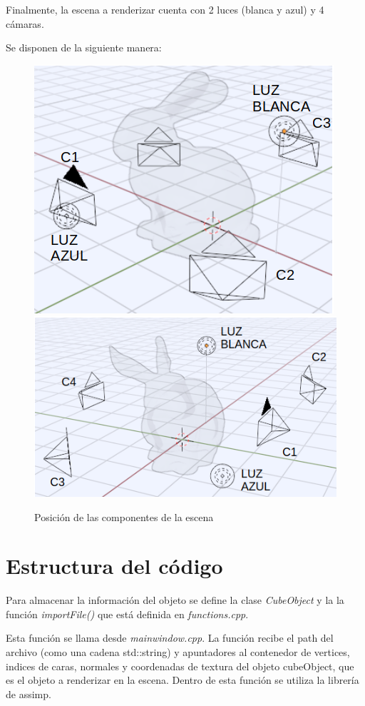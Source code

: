 \documentclass[12pt]{article}
\begin{document}
Finalmente, la escena a renderizar cuenta con 2 luces (blanca y azul) y 4 cámaras.

Se disponen de la siguiente manera: 


\begin{figure}[H]
\centering
\includegraphics[scale=0.5]{images/escena11.png}
\includegraphics[scale=0.5]{images/escena22.png}
\caption{Posición de las componentes de la escena}
\end{figure}



\section{Estructura del código}

Para almacenar la información del objeto se define la clase \textit{CubeObject} y la  la función \textit{importFile()} que está definida en \textit{functions.cpp}.

Esta función se llama desde \textit{mainwindow.cpp}. La función recibe el path del archivo (como una cadena std::string) y apuntadores al contenedor de vertices, indices de caras, normales y coordenadas de textura del objeto cubeObject, que es el objeto  a renderizar en la escena. Dentro de esta función se utiliza la librería de assimp.
\end{document}
